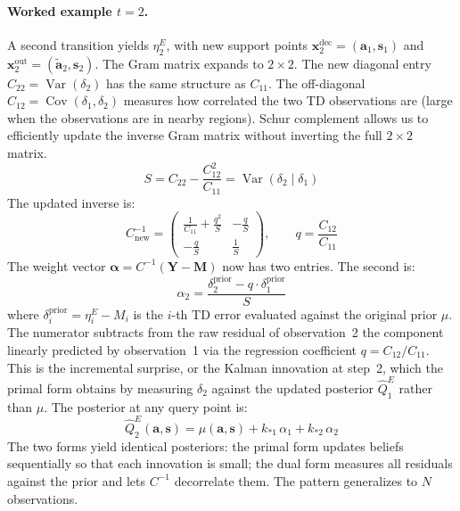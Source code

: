 \paragraph{Worked example $t = 2$.}
A second transition yields $\eta^E_2$, with new support points
$\mathbf{x}^{\mathrm{dec}}_2 = (\mathbf{a}_1, \mathbf{s}_1)$ and
$\mathbf{x}^{\mathrm{out}}_2 = (\tilde{\mathbf{a}}_2, \mathbf{s}_2)$.
The Gram matrix expands to $2 \times 2$. The new diagonal entry $C_{22}
= \operatorname{Var}(\delta_2)$ has the same structure as $C_{11}$.
The off-diagonal $C_{12} = \operatorname{Cov}(\delta_1, \delta_2)$ measures 
how correlated the two TD observations are (large when the observations are in nearby regions). 
Schur complement allows us to efficiently update the inverse Gram matrix without inverting the full $2 \times 2$ matrix.
\begin{equation}
    S = C_{22} - \frac{C_{12}^2}{C_{11}}
    = \operatorname{Var}(\delta_2 \mid \delta_1)
\end{equation}
The updated inverse is:
\begin{equation}
    C^{-1}_{\text{new}} = \begin{pmatrix}
        \frac{1}{C_{11}} + \frac{q^2}{S} & -\frac{q}{S} \\[4pt]
        -\frac{q}{S} & \frac{1}{S}
    \end{pmatrix}, \qquad q = \frac{C_{12}}{C_{11}}
\end{equation}
The weight vector $\boldsymbol{\alpha} = C^{-1}(\mathbf{Y} - \mathbf{M})$
now has two entries. The second is:
\begin{equation}
    \alpha_2
    = \frac{\delta^{\mathrm{prior}}_2 - q \cdot \delta^{\mathrm{prior}}_1}{S}
\end{equation}
where $\delta^{\mathrm{prior}}_i = \eta^E_i - M_i$ is the $i$-th TD error
evaluated against the original prior $\mu$. The numerator subtracts from
the raw residual of observation~2 the component linearly predicted by
observation~1 via the regression coefficient $q = C_{12}/C_{11}$. This is
the incremental surprise, or the Kalman innovation at step~2, which
the primal form obtains by measuring $\delta_2$ against the updated posterior
$\hat{Q}^E_1$ rather than $\mu$. The posterior at any query point is:
\begin{equation}
    \hat{Q}^E_2(\mathbf{a}, \mathbf{s})
    = \mu(\mathbf{a}, \mathbf{s})
    + k_{*1}\,\alpha_1 + k_{*2}\,\alpha_2
\end{equation}
The two forms yield identical posteriors: the primal form updates beliefs
sequentially so that each innovation is small; the dual form measures all
residuals against the prior and lets $C^{-1}$ decorrelate them. The pattern
generalizes to $N$ observations.